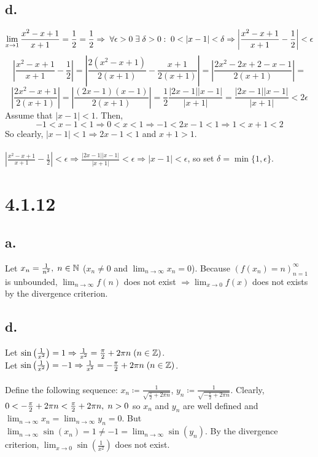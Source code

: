 \documentclass[11pt]{article}
\begin{document}
\subsection*{d.}
\[\lim_{x\to1} \frac{x^2-x+1}{x+1}=\frac{1}{2} = \frac{1}{2}\Rightarrow \hspace{1mm} \forall\epsilon>0 \hspace{1mm} \exists\hspace{1mm}\delta>0:\hspace{1mm}0<|x-1|<\delta\Rightarrow\left|\frac{x^2-x+1}{x+1}-\frac{1}{2}\right| < \epsilon\]
\[\left|\frac{x^2-x+1}{x+1}-\frac{1}{2}\right|=\left|\frac{2(x^2-x+1)}{2(x+1)}-\frac{x+1}{2(x+1)}\right|=\left|\frac{2x^2-2x+2-x-1}{2(x+1)}\right|=\]
\[\left|\frac{2x^2-x+1}{2(x+1)}\right|=\left|\frac{(2x-1)(x-1)}{2(x+1)}\right|=\frac{1}{2}\frac{|2x-1||x-1|}{|x+1|}=\frac{|2x-1||x-1|}{|x+1|} < 2\epsilon\]
Assume that $|x-1| < 1$. Then,
\[-1<x-1<1\Rightarrow 0<x<1\Rightarrow -1<2x-1<1 \Rightarrow 1 < x+1 < 2\]
So clearly, $|x-1|< 1 \Rightarrow 2x-1 < 1$ and $x+1 > 1$. \\
\\
$\left|\frac{x^2-x+1}{x+1}-\frac{1}{2}\right| < \epsilon \Rightarrow \frac{|2x-1||x-1|}{|x+1|} < \epsilon \Rightarrow |x-1| < \epsilon$, so set $\delta = \min\{1,\epsilon\}$.

\section*{4.1.12}
\subsection*{a.}
Let $x_n = \frac{1}{n^2},\hspace{1mm} n \in \mathbb{N}$ ($x_n\neq0$ and $\lim_{n\to\infty}x_n = 0$). Because $(f(x_n)=n)_{n=1}^\infty$ is unbounded, $\lim_{n\to\infty}f(n)$ does not exist $\Rightarrow \lim_{x\to0}f(x)$ does not exists by the divergence criterion.

\subsection*{d.}
Let $\sin\left(\frac{1}{x^2}\right)=1\Rightarrow \frac{1}{x^2} = \frac{\pi}{2} + 2\pi n \hspace{1mm} (n\in\mathbb{Z})$. \\
Let $\sin\left(\frac{1}{x^2}\right)=-1\Rightarrow \frac{1}{x^2} = -\frac{\pi}{2} + 2\pi n \hspace{1mm} (n\in\mathbb{Z})$. \\
\\
Define the following sequence: $x_n\coloneqq \frac{1}{\sqrt{\frac{\pi}{2}+2\pi n}}$, $y_n\coloneqq \frac{1}{\sqrt{-\frac{\pi}{2}+2\pi n}}$. Clearly, $0 < -\frac{\pi}{2} + 2\pi n < \frac{\pi}{2}+2\pi n, \hspace{1mm} n>0$ so $x_n$ and $y_n$ are well defined and $\lim_{n\to\infty}x_n=\lim_{n\to\infty}y_n=0$. But $\lim_{n\to\infty}\sin(x_n)=1 \neq -1 = \lim_{n\to\infty}\sin(y_n)$. By the divergence criterion, $\lim_{x\to0}\sin\left(\frac{1}{x^2}\right)$ does not exist.
\end{document}
